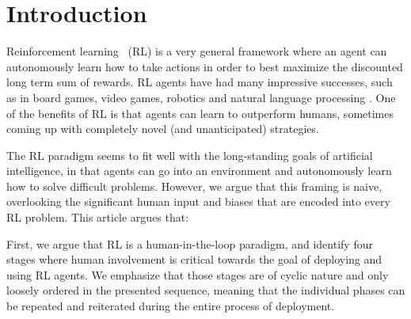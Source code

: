 \documentclass[twoside,11pt]{article}
\begin{document}
\section{Introduction}
\label{sec:introduction}

%

Reinforcement learning~\cite{SuttonBarto:2018:RLIntroduction} (RL) is a very general framework where an agent can autonomously learn how to take actions in order to best maximize the discounted long term sum of rewards. RL agents have had many impressive successes, such as in board games, video games, robotics and natural language processing \citep{Li:2017:DRLSurvey}. One of the benefits of RL is that agents can learn to outperform humans, sometimes coming up with completely novel (and unanticipated) strategies.

The RL paradigm seems to fit well with the long-standing goals of artificial intelligence, in that agents can go into an environment and autonomously learn how to solve difficult problems. However, we argue that this framing is naive, overlooking the significant human input and biases that are encoded into every RL problem. This article argues that: 
\begin{center}
\end{center}

First, we argue that RL is a human-in-the-loop paradigm, and identify four stages where human involvement is critical towards the goal of deploying and using RL agents. We emphasize that those stages are of cyclic nature and only loosely ordered in the presented sequence, meaning that the individual phases can be repeated and reiterated during the entire process of deployment.
\end{document}
